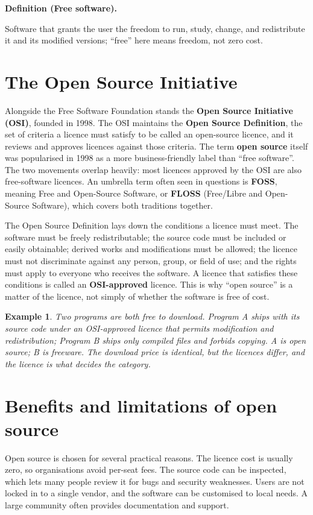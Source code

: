 \documentclass[11pt]{article}
\newtheorem{example}{Example}[section]
\newenvironment{definitionbox}[1]{%
  \par\noindent\textbf{Definition (#1).}\ \itshape
}{\par\vspace{0.3em}}
\begin{document}
\begin{definitionbox}{Free software}
Software that grants the user the freedom to run, study, change, and
redistribute it and its modified versions; ``free'' here means freedom, not
zero cost.
\end{definitionbox}

\section{The Open Source Initiative}
Alongside the Free Software Foundation stands the \textbf{Open Source
Initiative (OSI)}, founded in 1998. The OSI maintains the \textbf{Open Source
Definition}, the set of criteria a licence must satisfy to be called an
open-source licence, and it reviews and approves licences against those
criteria. The term \textbf{open source} itself was popularised in 1998 as a
more business-friendly label than ``free software''. The two movements
overlap heavily: most licences approved by the OSI are also free-software
licences. An umbrella term often seen in questions is \textbf{FOSS}, meaning
Free and Open-Source Software, or \textbf{FLOSS} (Free/Libre and Open-Source
Software), which covers both traditions together.

The Open Source Definition lays down the conditions a licence must meet. The
software must be freely redistributable; the source code must be included or
easily obtainable; derived works and modifications must be allowed; the
licence must not discriminate against any person, group, or field of use; and
the rights must apply to everyone who receives the software. A licence that
satisfies these conditions is called an \textbf{OSI-approved} licence. This is
why ``open source'' is a matter of the licence, not simply of whether the
software is free of cost.

\begin{example}
Two programs are both free to download. Program A ships with its source code
under an OSI-approved licence that permits modification and redistribution;
Program B ships only compiled files and forbids copying. A is open source; B
is \emph{freeware}. The download price is identical, but the licences differ,
and the licence is what decides the category.
\end{example}

\section{Benefits and limitations of open source}
Open source is chosen for several practical reasons. The licence cost is
usually zero, so organisations avoid per-seat fees. The source code can be
inspected, which lets many people review it for bugs and security weaknesses.
Users are not locked in to a single vendor, and the software can be
customised to local needs. A large community often provides documentation and
support.
\end{document}
